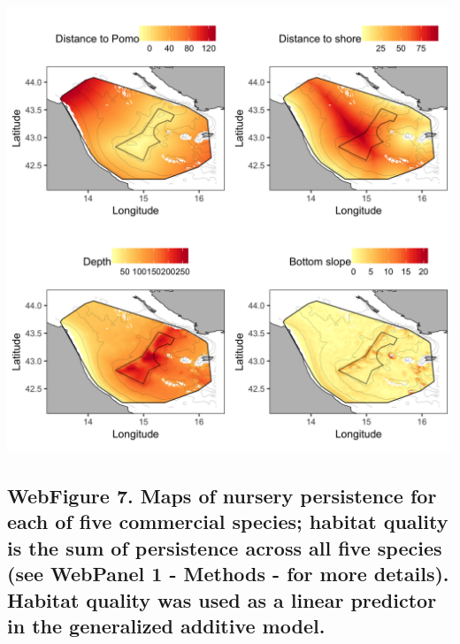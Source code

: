 \documentclass[11pt,]{article}
\begin{document}
\includegraphics[width=1.00000\textwidth]{../ms_1/ms_1_figs/map_predictors.png}

\newpage

\subsection{WebFigure 7. Maps of nursery persistence for each of five
commercial species; habitat quality is the sum of persistence across all
five species (see WebPanel 1 - Methods - for more details). Habitat
quality was used as a linear predictor in the generalized additive
model.}\label{webfigure-7.-maps-of-nursery-persistence-for-each-of-five-commercial-species-habitat-quality-is-the-sum-of-persistence-across-all-five-species-see-webpanel-1---methods---for-more-details.-habitat-quality-was-used-as-a-linear-predictor-in-the-generalized-additive-model.}
\end{document}
